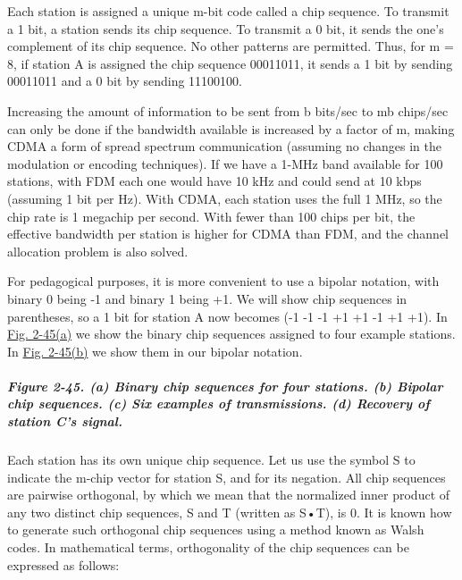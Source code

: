 \documentclass[b5paper,11pt]{memoir}
\begin{document}
Each station is assigned a unique {m}-bit code called a {chip sequence}.
To transmit a 1 bit, a station sends its chip sequence. To transmit a 0
bit, it sends the one's complement of its chip sequence. No other
patterns are permitted. Thus, for {m} = 8, if station {A} is assigned
the chip sequence 00011011, it sends a 1 bit by sending 00011011 and a 0
bit by sending 11100100.

Increasing the amount of information to be sent from {b} bits/sec to
{mb} chips/sec can only be done if the bandwidth available is increased
by a factor of {m}, making CDMA a form of spread spectrum communication
(assuming no changes in the modulation or encoding techniques). If we
have a 1-MHz band available for 100 stations, with FDM each one would
have 10 kHz and could send at 10 kbps (assuming 1 bit per Hz). With
CDMA, each station uses the full 1 MHz, so the chip rate is 1 megachip
per second. With fewer than 100 chips per bit, the effective bandwidth
per station is higher for CDMA than FDM, and the channel allocation
problem is also solved.

For pedagogical purposes, it is more convenient to use a bipolar
notation, with binary 0 being -1 and binary 1 being +1. We will show
chip sequences in parentheses, so a 1 bit for station {A} now becomes
(-1 -1 -1 +1 +1 -1 +1 +1). In
\protect\hyperlink{0130661023_ch02lev1sec6.htmlux5cux23ch02fig45}{Fig.
2-45(a)} we show the binary chip sequences assigned to four example
stations. In
\protect\hyperlink{0130661023_ch02lev1sec6.htmlux5cux23ch02fig45}{Fig.
2-45(b)} we show them in our bipolar notation.

\subparagraph[Figure 2-45. (a) Binary chip sequences for four stations.
(b) Bipolar chip sequences. (c) Six examples of transmissions. (d)
Recovery of station C's
signal.]{\texorpdfstring{\protect\hypertarget{0130661023_ch02lev1sec6.htmlux5cux23ch02fig45}{}{}Figure
2-45. (a) Binary chip sequences for four stations. (b) Bipolar chip
sequences. (c) Six examples of transmissions. (d) Recovery of station
C's
signal.}{Figure 2-45. (a) Binary chip sequences for four stations. (b) Bipolar chip sequences. (c) Six examples of transmissions. (d) Recovery of station C's signal.}}


Each station has its own unique chip sequence. Let us use the symbol {S}
to indicate the {m}-chip vector for station {S}, and
 for its negation. All chip sequences are
pairwise {orthogonal}, by which we mean that the normalized inner
product of any two distinct chip sequences, {S} and {T} (written as
{S}•{T}), is 0. It is known how to generate such orthogonal chip
sequences using a method known as {Walsh codes}. In mathematical terms,
orthogonality of the chip sequences can be expressed as follows:
\end{document}

